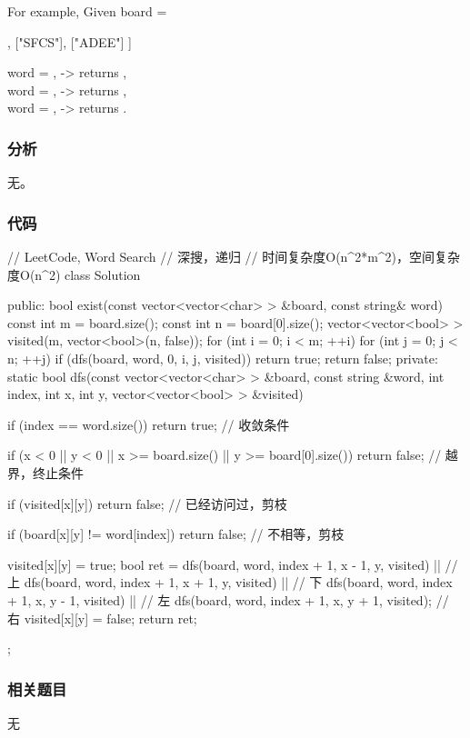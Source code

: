 For example,
Given board =
\begin{Code}
[
  ["ABCE"],
  ["SFCS"],
  ["ADEE"]
]
\end{Code}
word = , -> returns ,\\
word = , -> returns ,\\
word = , -> returns .


\subsubsection{分析}
无。


\subsubsection{代码}
\begin{Code}
// LeetCode, Word Search
// 深搜，递归
// 时间复杂度O(n^2*m^2)，空间复杂度O(n^2)
class Solution {
public:
    bool exist(const vector<vector<char> > &board, const string& word) {
        const int m = board.size();
        const int n = board[0].size();
        vector<vector<bool> > visited(m, vector<bool>(n, false));
        for (int i = 0; i < m; ++i)
            for (int j = 0; j < n; ++j)
                if (dfs(board, word, 0, i, j, visited))
                    return true;
        return false;
    }
private:
    static bool dfs(const vector<vector<char> > &board, const string &word,
            int index, int x, int y, vector<vector<bool> > &visited) {
        if (index == word.size())
            return true; // 收敛条件

        if (x < 0 || y < 0 || x >= board.size() || y >= board[0].size())
            return false;  // 越界，终止条件

        if (visited[x][y]) return false; // 已经访问过，剪枝

        if (board[x][y] != word[index]) return false; // 不相等，剪枝

        visited[x][y] = true;
        bool ret = dfs(board, word, index + 1, x - 1, y, visited) || // 上
                dfs(board, word, index + 1, x + 1, y, visited)    || // 下
                dfs(board, word, index + 1, x, y - 1, visited)    || // 左
                dfs(board, word, index + 1, x, y + 1, visited);      // 右
        visited[x][y] = false;
        return ret;
    }
};
\end{Code}


\subsubsection{相关题目}
\begindot
\item 无
\myenddot


